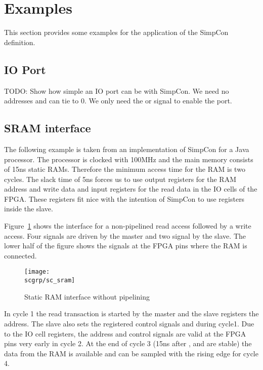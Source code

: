 \section{Examples}

This section provides some examples for the application of the
SimpCon definition.

\subsection{IO Port}

TODO: Show how simple an IO port can be with SimpCon. We need no
addresses and can tie  to 0. We only need the
 or  signal to enable the port.

\subsection{SRAM interface}

The following example is taken from an implementation of SimpCon for
a Java processor. The processor is clocked with 100MHz and the main
memory consists of 15ns static RAMs. Therefore the minimum access
time for the RAM is two cycles. The slack time of 5ns forces us to
use output registers for the RAM address and write data and input
registers for the read data in the IO cells of the FPGA. These
registers fit nice with the intention of SimpCon to use registers
inside the slave.

Figure~\ref{fig:sc:sram} shows the interface for a non-pipelined
read access followed by a write access. Four signals are driven by
the master and two signal by the slave. The lower half of the figure
shows the signals at the FPGA pins where the RAM is connected.

\begin{figure}
    \centering
    \texttt{[image: \\scgrp/sc\_sram]}
    \caption{Static RAM interface without pipelining}
    \label{fig:sc:sram}
\end{figure}

In cycle 1 the read transaction is started by the master and the
slave registers the address. The slave also sets the registered
control signals  and  during cycle1. Due to the
IO cell registers, the address and control signals are valid at the
FPGA pins very early in cycle 2. At the end of cycle 3 (15ns after
,  and  are stable) the data from
the RAM is available and can be sampled with the rising edge for
cycle 4.

